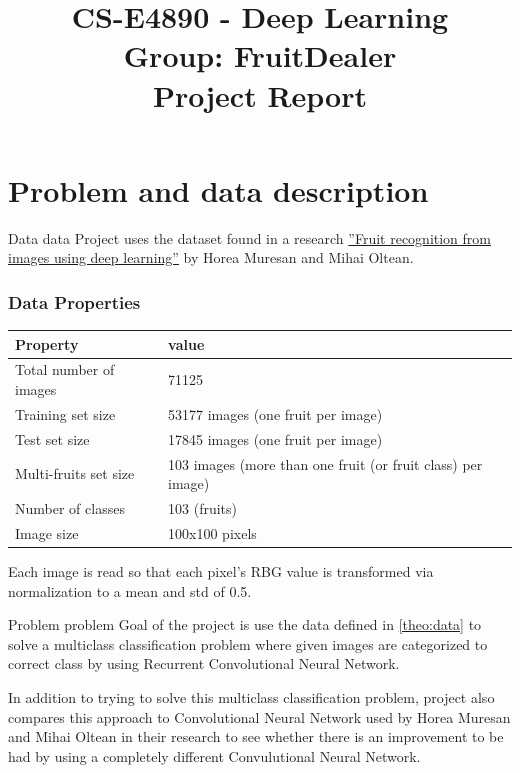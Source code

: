 \documentclass[article,11pt]{article}
\title{CS-E4890 - Deep Learning \\ Group: FruitDealer\\ \large Project Report}
\begin{document}

\date{}
\maketitle

\section{Problem and data description}
\begin{definition}{{\small Data }}{data}
    Project uses the dataset found in a research \href{https://www.researchgate.net/publication/321475443_Fruit_recognition_from_images_using_deep_learning}{''Fruit recognition from images using deep learning''} 
    by Horea Muresan and Mihai Oltean.
    \subsubsection{Data Properties}
    \begin{tabular}{| l | l |}
        \hline
        \bf Property & \bf value \\
        \hline			
        Total number of images & 71125 \\
    Training set size & 53177 images (one fruit per image) \\
    Test set size & 17845 images (one fruit per image) \\
    Multi-fruits set size & 103 images (more than one fruit (or fruit class) per image) \\
    Number of classes &  103 (fruits) \\
    Image size & 100x100 pixels \\
        \hline  
    \end{tabular}
    Each image is read so that each pixel's RBG value is transformed via normalization to a mean and std of 0.5.
\end{definition}
\begin{definition}{{\small Problem }}{problem}
    Goal of the project is use the data defined in \cref{theo:data} to solve a multiclass classification problem where given images are categorized to correct class by using 
    Recurrent Convolutional Neural Network.
    
    In addition to trying to solve this multiclass classification problem, project also compares this approach to Convolutional Neural Network used by Horea Muresan
    and Mihai Oltean in their research to see whether there is an improvement to be had by using a completely different Convulutional Neural Network.
\end{definition}
\end{document}

